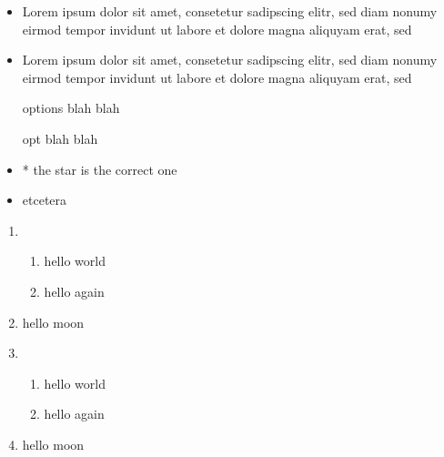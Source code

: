 \documentclass{article}
\begin{document}
\begin{itemize}
  \item Lorem ipsum dolor sit amet, consetetur sadipscing elitr, sed diam
    nonumy eirmod tempor invidunt ut labore et dolore magna aliquyam erat, sed
  \item Lorem ipsum dolor sit amet, consetetur sadipscing elitr, sed diam
    nonumy eirmod tempor invidunt ut labore et dolore magna aliquyam erat, sed
\end{itemize}

\begin{itemize}
  something here

  \item [options] blah blah
  \item[opt] blah blah
  \item * the star is the correct one
  \item etcetera
\end{itemize}

\begin{enumerate}
  \item \begin{enumerate}
      \item hello
        world
      \item hello
        again
    \end{enumerate}
  \item hello
    moon
  \item
    \begin{enumerate}
      \item hello
        world
      \item hello
        again
    \end{enumerate}
  \item hello
    moon
\end{enumerate}
\end{document}

